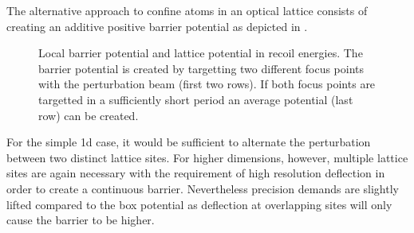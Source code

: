 The alternative approach to confine atoms in an optical lattice consists of
creating an additive positive barrier potential as depicted in
.
\begin{figure}[htb]
  \centering
  \begin{adjustbox}{width=\textwidth}
    
  \end{adjustbox}
  \caption{Local barrier potential and lattice potential in recoil energies.
    The barrier potential is created by targetting two different focus points
    with the perturbation beam (first two rows). If both focus points are
    targetted in a sufficiently short period an average potential (last row)
    can be created.}\label{fig:effective_potential_barrier}
\end{figure}
For the simple \gls{1d} case, it would be sufficient to alternate the
perturbation between two distinct lattice sites. For higher dimensions,
however, multiple lattice sites are again necessary with the requirement of
high resolution deflection in order to create a continuous barrier.
Nevertheless precision demands are slightly lifted compared to the box
potential as deflection at overlapping sites will only cause the barrier to be
higher.
